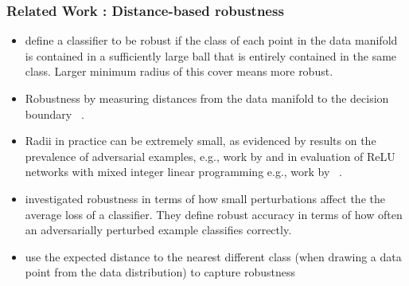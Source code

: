  \begin{frame}
   \frametitle{Related Work : Distance-based robustness}

   \begin{itemize}
\item  \citet{khoury2018} define a classifier to be robust if the class of
 each point in the data manifold is contained in a sufficiently large
 ball that is entirely contained in the same class. Larger minimum
 radius of this cover means more robust. 
\item  Robustness by measuring distances from the data manifold to the decision boundary
 ~\citep{Wang2020Improving, xu2023exploring, he2018decision}.

 \item Radii in practice can be extremely small, as evidenced by
 results on the prevalence of adversarial examples, e.g., work by
 \citet{inevitable2018} and in evaluation of ReLU networks with mixed
 integer linear programming e.g., work by ~\citet{tjeng2017evaluating}.

\item \citet{tsipras2018robustness} investigated robustness in terms of how
  small perturbations affect the the average loss of a
  classifier. They define robust accuracy in terms of how often an
  adversarially perturbed example classifies correctly.

  \item \citet{gilmer2018adversarial} use the expected distance to
 the nearest different class (when drawing a data point from the data
 distribution) to capture robustness
\end{itemize}
\end{frame}

